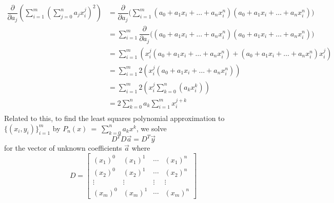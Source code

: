 \documentclass[11pt]{article}
\begin{document}
\begin{align*}
\dfrac{\partial}{\partial a_j} \left(\sum_{i=1}^m \left(\sum_{j=0}^n a_j x_i^j\right)^2 \right) & = \dfrac{\partial}{\partial a_j}\Big(\sum_{i=1}^m (a_0 + a_1x_i + \dots + a_n x_i^n)(a_0 + a_1x_i + \dots + a_n x_i^n)\Big)\\
& = \sum_{i=1}^m \dfrac{\partial}{\partial a_j}\Big((a_0 + a_1x_i + \dots + a_n x_i^n)(a_0 + a_1x_i + \dots + a_n x_i^n)\Big)\\
& = \sum_{i=1}^m \left(x_i^j(a_0 + a_1x_i + \dots + a_n x_i^n) + (a_0 + a_1x_i + \dots + a_n x_i^n) x_i^j\right)\\
& = \sum_{i=1}^m 2\left(x_i^j(a_0 + a_1x_i + \dots + a_n x_i^n)\right)\\
& = \sum_{i=1}^m 2\left(x_i^j\sum_{k=0}^n(a_kx_i^k)\right)\\
& = 2\sum_{k=0}^n a_k \sum_{i=1}^m x_i^{j+k}\\
\end{align*}
Related to this, to find the least squares polynomial approximation to \(\{(x_i, y_i)\}_{i=1}^m\) by \(P_n(x)~=~\sum\limits_{k=0}^n a_k x^k\), we solve \[D^TD\vec{a} =D^T\vec{y}\] for the vector of unknown coefficients \(\vec{a}\) where \[D = \left[\begin{array}{cccc} (x_1)^0 & (x_1)^1 & \cdots & (x_1)^n\\
(x_2)^0 & (x_2)^1 & \cdots & (x_2)^n\\
\vdots & \vdots & \vdots & \vdots\\
(x_m)^0 & (x_m)^1 & \cdots & (x_m)^n
\end{array}\right]\]

\newpage
\end{document}

